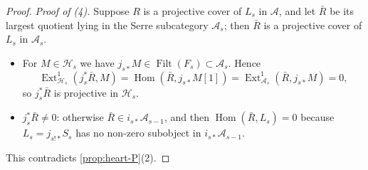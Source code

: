 \documentclass[11pt,reqno]{amsart}
\theoremstyle{plain}
\theoremstyle{definition}
\theoremstyle{remark}
\DeclareMathOperator{\Hom}{Hom}
\DeclareMathOperator{\Ext}{Ext}
\DeclareMathOperator{\Filt}{Filt}
\newcommand{\cA}{\mathcal{A}}
\newcommand{\cH}{\mathcal{H}}
\begin{document}
\begin{proof}
\emph{Proof of (4).} Suppose $R$ is a projective cover of $L_s$ in $\cA$, and let $\bar R$ be its largest quotient lying in the Serre subcategory $\cA_s$; then $\bar R$ is a projective cover of $L_s$ in $\cA_s$.
\begin{itemize}
\item For $M\in\cH_s$ we have $j_{s*}M\in\Filt(F_s)\subset\cA_s$. Hence
\[\Ext^1_{\cH_s}(j_s^*\bar R,M)=\Hom(\bar R,j_{s*}M[1])=\Ext^1_{\cA_s}(\bar R,j_{s*}M)=0,\]
so $j_s^*\bar R$ is projective in $\cH_s$.
\item $j_s^*\bar R\ne0$: otherwise $\bar R\in i_{s*}\cA_{s-1}$, and then $\Hom(\bar R,L_s)=0$ because $L_s=j_{s!*}S_s$ has no non-zero subobject in $i_{s*}\cA_{s-1}$.
\end{itemize}
This contradicts \cref{prop:heart-P}(2).
\end{proof}
\end{document}
